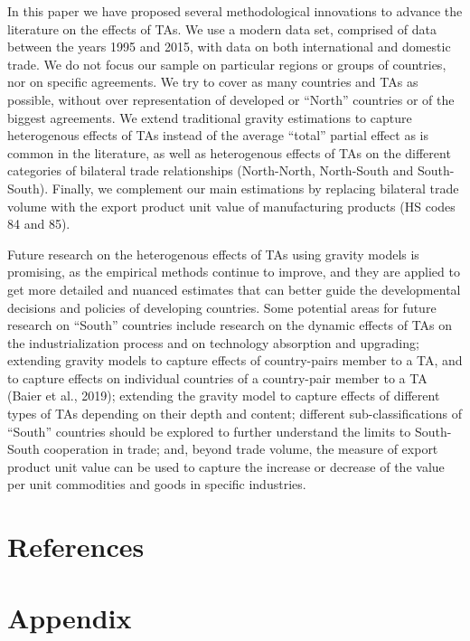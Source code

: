 \documentclass[12pt]{article}%
\begin{document}
In this paper we have proposed several methodological innovations to
advance the literature on the effects of TAs. We use a modern data set,
comprised of data between the years 1995 and 2015, with data on both
international and domestic trade. We do not focus our sample on
particular regions or groups of countries, nor on specific agreements.
We try to cover as many countries and TAs as possible, without over
representation of developed or ``North'' countries or of the biggest
agreements. We extend traditional gravity estimations to capture
heterogenous effects of TAs instead of the average ``total'' partial
effect as is common in the literature, as well as heterogenous effects
of TAs on the different categories of bilateral trade relationships
(North-North, North-South and South-South). Finally, we complement our
main estimations by replacing bilateral trade volume with the export
product unit value of manufacturing products (HS codes 84 and 85).

Future research on the heterogenous effects of TAs using gravity models
is promising, as the empirical methods continue to improve, and they are
applied to get more detailed and nuanced estimates that can better guide
the developmental decisions and policies of developing countries. Some
potential areas for future research on ``South'' countries include
research on the dynamic effects of TAs on the industrialization process
and on technology absorption and upgrading; extending gravity models to
capture effects of country-pairs member to a TA, and to capture effects
on individual countries of a country-pair member to a TA (Baier et al.,
2019); extending the gravity model to capture effects of different types
of TAs depending on their depth and content; different
sub-classifications of ``South'' countries should be explored to further
understand the limits to South-South cooperation in trade; and, beyond
trade volume, the measure of export product unit value can be used to
capture the increase or decrease of the value per unit commodities and
goods in specific industries.

%
\newpage%
\section{References}%
\label{sec:References}%
\printbibliography

%
\newpage%
\section{Appendix}%
\label{sec:Appendix}%
\end{document}
